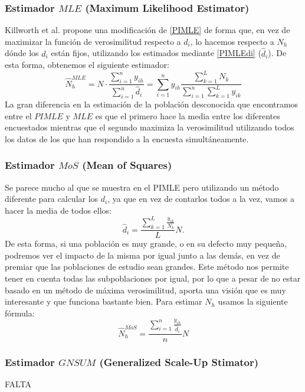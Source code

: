 \documentclass{article}
\begin{document}
\subsubsection{ Estimador $MLE$ (Maximum Likelihood Estimator)}
Killworth et al.\cite{Kill2} propone una modificación de \ref{PIMLE} de forma que, en vez de maximizar la función de verosimilitud respecto a $d_i$, lo hacemos respecto a ${N_h}$ dónde los $d_i$ están fijos, utilizando los estimados mediante \ref{PIMLEdi} ($\hat{d}_i$). De esta forma, obtenemos el siguiente estimador:
\begin{equation} \label{MLE}
    \hat{N}_h^{MLE} = N\cdot\frac{\sum_{i=1}^ny_{ih}}{\sum_{i=1}^n\hat{d}_i} = {\sum_{i=1}^ny_{ih}}\frac{\sum_{k = 1}^LN_k}{\sum_{i=1}^n \sum_{k = 1}^Ly_{ik}}
\end{equation}
La gran diferencia en la estimación de la población desconocida que encontramos entre el $PIMLE$ y $MLE$ es que el primero hace la media entre los diferentes encuestados mientras que el segundo maximiza la verosimilitud utilizando todos los datos de los que han respondido a la encuesta simultáneamente.
\subsubsection{ Estimador $MoS$ (Mean of Squares)}
 Se parece mucho al que se muestra en el PIMLE pero utilizando un método diferente para calcular los $d_i$, ya que en vez de contarlos todos a la vez, vamos a hacer la media de todos ellos:
\begin{equation}\label{MoSdi}
    \hat{d}_i =  \frac{\sum_{k = 1}^L \frac{y_{ik}}{N_k}}{L} N.
\end{equation}
De esta forma, si una población es muy grande, o en su defecto muy pequeña, podremos ver el impacto de la misma por igual junto a las demás, en vez de premiar que las poblaciones de estudio sean grandes. Este método nos permite tener en cuenta todas las subpoblaciones por igual, por lo que a pesar de no estar basado en un método de máxima verosimilitud, aporta una visión que es muy interesante y que funciona bastante bien. Para estimar $N_h$ usamos la siguiente fórmula:
\begin{equation} \label{MoS}
    \hat{N}_h^{MoS} =  \frac{\sum_{i = 1}^n\frac{y_{ih}}{\hat{d}_i}}{n}N
\end{equation}
\subsubsection{Estimador $GNSUM$ (Generalized Scale-Up Stimator)}
FALTA
\end{document}
